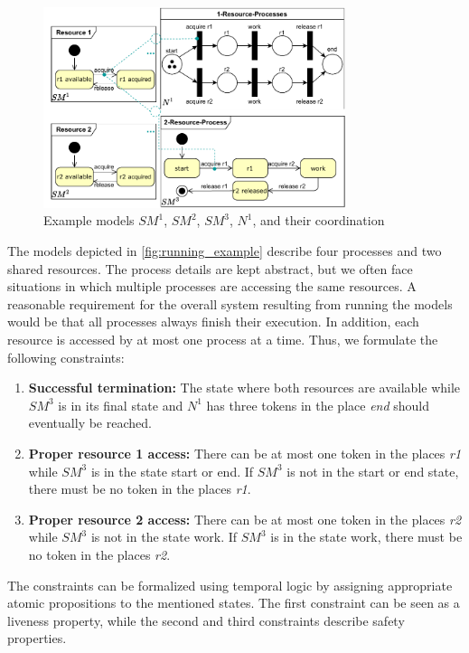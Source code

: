 \documentclass[conference]{IEEEtran}
\begin{document}
\begin{figure}[h]
    \centering
    \includegraphics[width=3.48in]{example}
    \caption{Example models $SM^1$, $SM^2$, $SM^3$, $N^1$, and their coordination}
    \label{fig:running_example}
\end{figure}

The models depicted in \autoref{fig:running_example} describe four processes and two shared resources.
The process details are kept abstract, but we often face situations in which multiple processes are accessing the same resources.
A reasonable requirement for the overall system resulting from running the models would be that all processes always finish their execution.
In addition, each resource is accessed by at most one process at a time.
Thus, we formulate the following constraints:
\begin{enumerate}
    \item \textbf{Successful termination:} The state where both resources are available while $SM^3$ is in its final state and $N^1$ has three tokens in the place \textit{end} should eventually be reached.
    \item \textbf{Proper resource 1 access:} There can be at most one token in the places \textit{r1} while $SM^3$ is in the state start or end.
    If $SM^3$ is not in the start or end state, there must be no token in the places \textit{r1}.
    \item \textbf{Proper resource 2 access:} There can be at most one token in the places \textit{r2} while $SM^3$ is not in the state work.
    If $SM^3$ is in the state work, there must be no token in the places \textit{r2}.
\end{enumerate}

The constraints can be formalized using temporal logic by assigning appropriate atomic propositions to the mentioned states.
The first constraint can be seen as a liveness property, while the second and third constraints describe safety properties.
\end{document}
